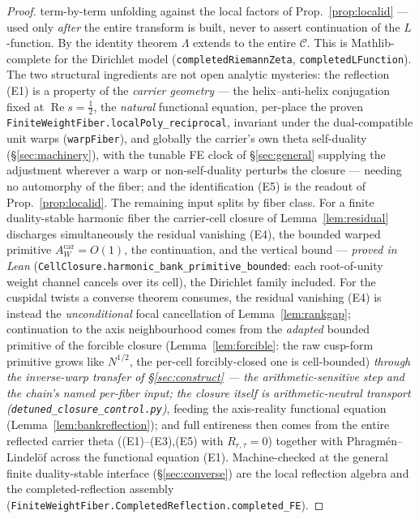 \documentclass[11pt]{article}
\theoremstyle{definition}
\renewcommand{\Re}{\operatorname{Re}}
\begin{document}
\begin{proof}
term-by-term unfolding against the local factors of Prop.~\ref{prop:localid} --- used only \emph{after} the
entire transform is built, never to assert continuation of the $L$-function. By the identity theorem
$\Lambda$ extends to the entire $\mathcal C$. This is Mathlib-complete for the Dirichlet model
(\texttt{completedRiemannZeta}, \texttt{completedLFunction}). The two structural ingredients are not open
analytic mysteries: the reflection \textup{(E1)} is a property of the \emph{carrier geometry} --- the
helix--anti-helix conjugation fixed at $\Re s=\tfrac12$, the \emph{natural} functional equation, per-place
the proven \texttt{FiniteWeightFiber.localPoly\_reciprocal}, invariant under the dual-compatible unit warps
(\texttt{warpFiber}), and globally the carrier's own theta self-duality (\S\ref{sec:machinery}), with the
tunable FE clock of \S\ref{sec:general} supplying the adjustment wherever a warp or non-self-duality
perturbs the closure --- needing no automorphy of the fiber; and the identification \textup{(E5)} is the
readout of Prop.~\ref{prop:localid}. The remaining input splits by fiber class. For a finite duality-stable
harmonic fiber the carrier-cell closure of Lemma~\ref{lem:residual} discharges simultaneously the residual
vanishing \textup{(E4)}, the bounded warped primitive $A^{\mathrm{car}}_W=O(1)$, the continuation, and the
vertical bound --- \emph{proved in Lean} (\texttt{CellClosure.harmonic\_bank\_primitive\_bounded}: each
root-of-unity weight channel cancels over its cell), the Dirichlet family included. For the cuspidal twists a
converse theorem consumes, the residual vanishing \textup{(E4)} is instead the \emph{unconditional} focal
cancellation of Lemma~\ref{lem:rankgap}; continuation to the axis neighbourhood comes from the \emph{adapted}
bounded primitive of the forcible closure (Lemma~\ref{lem:forcible}: the raw cusp-form primitive grows like
$N^{1/2}$, the per-cell forcibly-closed one is cell-bounded) \emph{through the inverse-warp transfer of
\S\ref{sec:construct} --- the arithmetic-sensitive step and the chain's named per-fiber input; the closure
itself is arithmetic-neutral transport (\texttt{detuned\_closure\_control.py})}, feeding the axis-reality
functional equation (Lemma~\ref{lem:bankreflection}); and full entireness then comes from the entire reflected carrier theta
(\textup{(E1)--(E3),(E5)} with $R_{r,\tau}=0$) together with Phragm\'en--Lindel\"of across the functional
equation \textup{(E1)}. Machine-checked at the general finite
duality-stable interface (\S\ref{sec:converse}) are the local reflection algebra and the
completed-reflection assembly (\texttt{FiniteWeightFiber.CompletedReflection.completed\_FE}).
\end{proof}
\end{document}
